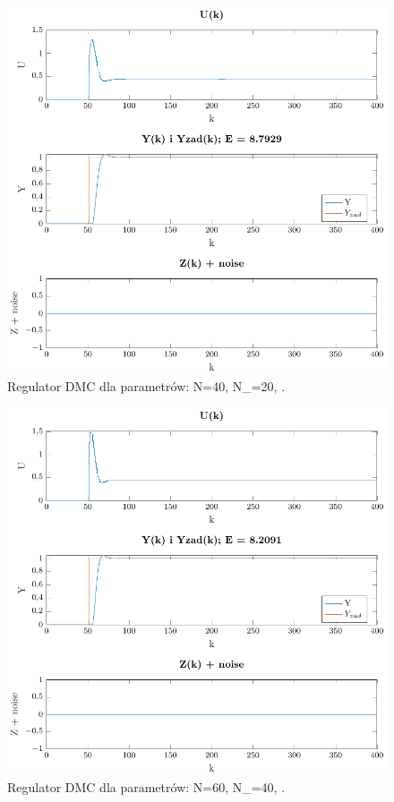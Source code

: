 \documentclass[a4paper,titlepage,11pt,twosides,floatssmall]{mwrep}
\begin{document}
 
\begin{figure}[H]
	\centering
	\includegraphics[scale=0.85]{../../Lab2/PDF_rysunki/Z4_DMCParametryN_40_Nu_20_lam_2.pdf}
	\caption{Regulator DMC dla parametrów: N=40, N_{}=20, .}
	\label{dobor_param5}
\end{figure}

\begin{figure}[H]
	\centering
	\includegraphics[scale=0.85]{../../Lab2/PDF_rysunki/Z4_DMCParametryN_60_Nu_40_lam_1.pdf}
	\caption{Regulator DMC dla parametrów: N=60, N_{}=40, .}
	\label{dobor_param6}
\end{figure}
\end{document}
